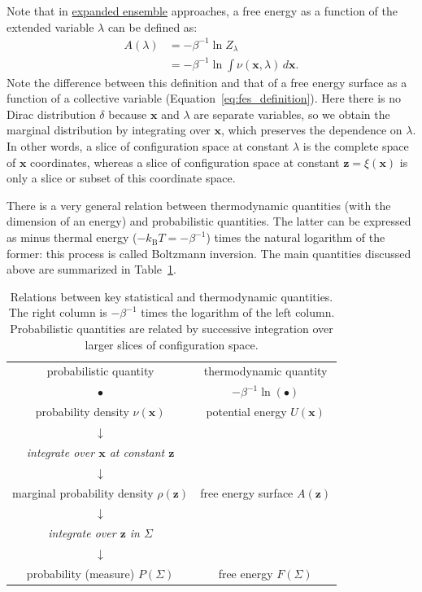 \documentclass[9pt,review]{livecoms}
\newcommand{\vx}{\mathbf{x}}
\newcommand{\vz}{\mathbf{z}}
\begin{document}
Note that in \hyperlink{ref:ExpEns} {expanded ensemble} approaches, a free energy as a function of the extended variable $\lambda$ can be defined as:
\begin{align}
    A(\lambda) &= -\beta^{-1} \ln Z_\lambda
    \nonumber \\
    &= -\beta^{-1} \ln \int
    \nu(\vx, \lambda)\, d\vx.
\end{align}
Note the difference between this definition and that of a free energy surface as a function of a collective variable (Equation~\ref{eq:fes_definition}).
Here there is no Dirac distribution $\delta$ because $\vx$ and $\lambda$ are separate variables, so we obtain the marginal distribution by integrating over $\vx$, which preserves the dependence on $\lambda$. In other words, a slice of configuration space at constant $\lambda$ is the complete space of $\vx$ coordinates, whereas a slice of configuration space at constant $\vz = \xi(\vx)$ is only  a slice or subset of this coordinate space.

There is a very general relation between thermodynamic quantities (with the dimension of an energy) and probabilistic quantities.
The latter can be expressed as minus thermal energy ($-k_\mathrm{B} T = -\beta^{-1}$) times the natural logarithm of the former: this process is called Boltzmann inversion.
The main quantities discussed above are summarized in Table~\ref{tab:quantities}.


\begin{table}[]
\small
    \centering
\begin{tabular}{c|c}
probabilistic quantity & thermodynamic quantity  \\
$\bullet$ &   $-\beta^{-1} \ln(\bullet)$ \\
\hline
probability density $\nu(\vx)$  & potential energy  $U(\vx)$\\
$\downarrow$ &  \\
\textit{integrate over $\vx$ at constant $\vz$} & \\
$\downarrow$ &  \\
marginal probability density $\rho(\vz)$ & free energy surface $A(\vz)$ \\
$\downarrow$ &  \\
\textit{integrate over $\vz$ in $\Sigma$} & \\
$\downarrow$ &  \\
probability (measure) $P(\Sigma)$  & free energy  $F(\Sigma)$\\
\end{tabular}
    \caption{Relations between key statistical and thermodynamic quantities.
    The right column is $-\beta^{-1}$ times the logarithm of the left column.
    Probabilistic quantities are related by successive integration over larger slices of configuration space.}
    \label{tab:quantities}
\end{table}
\end{document}
